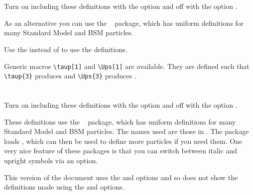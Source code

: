 \documentclass[mhchem,UKenglish,texlive=2016]{\ATLASLATEXPATH atlasdoc}
\begin{document}
\maketitle

\tableofcontents




\twocolumn
\section{}

Turn on including these definitions with the option  and off with the option .

As an alternative you can use the ~\cite{hepparticles} package,
which has uniform definitions for many Standard Model and BSM particles.

Use the  instead of  to use the  definitions.



Generic macros \verb|\taup[1]| and \verb|\Ups[1]| are available.
They are defined such that
\verb|\taup{3}| produces  and
\verb|\Ups{3}| produces .


\newpage
\section{}

Turn on including these definitions with the option  and off with the option .

These definitions use the ~\cite{hepparticles} package,
which has uniform definitions for many Standard Model and BSM particles.
The names used are those in .
The package loads , which can then be used to define more particles if you need them.
One very nice feature of these packages is that you can switch between italic and upright symbols via an option.

This version of the document uses the  and  options and so
does not show the definitions made using the  and  options.
%
\end{document}
